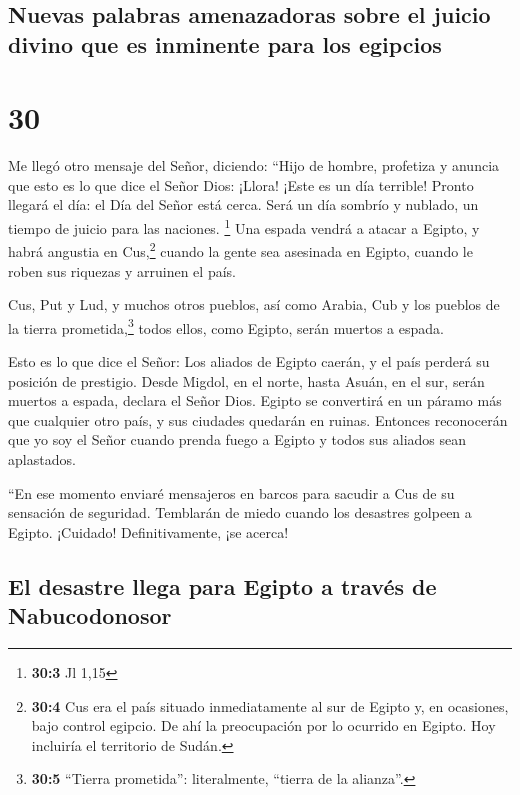 \hypertarget{nuevas-palabras-amenazadoras-sobre-el-juicio-divino-que-es-inminente-para-los-egipcios}{%
\subsection{Nuevas palabras amenazadoras sobre el juicio divino que es
inminente para los
egipcios}\label{nuevas-palabras-amenazadoras-sobre-el-juicio-divino-que-es-inminente-para-los-egipcios}}

\hypertarget{section-29}{%
\section{30}\label{section-29}}

 Me llegó otro mensaje del Señor, diciendo: 
``Hijo de hombre, profetiza y anuncia que esto es lo que dice el Señor
Dios: ¡Llora! ¡Este es un día terrible!  Pronto llegará el
día: el Día del Señor está cerca. Será un día sombrío y nublado, un
tiempo de juicio para las naciones. \footnote{\textbf{30:3} Jl 1,15}
 Una espada vendrá a atacar a Egipto, y habrá angustia en
Cus,\footnote{\textbf{30:4} Cus era el país situado inmediatamente al
  sur de Egipto y, en ocasiones, bajo control egipcio. De ahí la
  preocupación por lo ocurrido en Egipto. Hoy incluiría el territorio de
  Sudán.} cuando la gente sea asesinada en Egipto, cuando le roben sus
riquezas y arruinen el país.

 Cus, Put y Lud, y muchos otros pueblos, así como Arabia,
Cub y los pueblos de la tierra prometida,\footnote{\textbf{30:5}
  ``Tierra prometida'': literalmente, ``tierra de la alianza''.} todos
ellos, como Egipto, serán muertos a espada.

 Esto es lo que dice el Señor: Los aliados de Egipto
caerán, y el país perderá su posición de prestigio. Desde Migdol, en el
norte, hasta Asuán, en el sur, serán muertos a espada, declara el Señor
Dios.  Egipto se convertirá en un páramo más que cualquier
otro país, y sus ciudades quedarán en ruinas.  Entonces
reconocerán que yo soy el Señor cuando prenda fuego a Egipto y todos sus
aliados sean aplastados.

 ``En ese momento enviaré mensajeros en barcos para
sacudir a Cus de su sensación de seguridad. Temblarán de miedo cuando
los desastres golpeen a Egipto. ¡Cuidado! Definitivamente, ¡se acerca!

\hypertarget{el-desastre-llega-para-egipto-a-travuxe9s-de-nabucodonosor}{%
\subsection{El desastre llega para Egipto a través de
Nabucodonosor}\label{el-desastre-llega-para-egipto-a-travuxe9s-de-nabucodonosor}}

